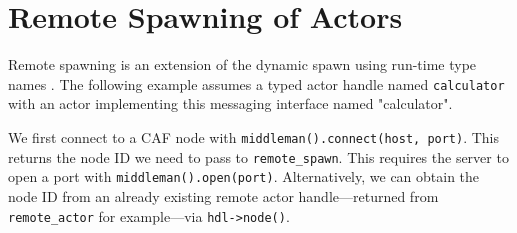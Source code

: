 \section{Remote Spawning of Actors \experimental}
\label{remote-spawn}

Remote spawning is an extension of the dynamic spawn using run-time type names . The following example assumes a typed actor handle named \lstinline^calculator^ with an actor implementing this messaging interface named "calculator".



We first connect to a CAF node with \lstinline^middleman().connect(host, port)^. This returns the node ID we need to pass to \lstinline^remote_spawn^. This requires the server to open a port with \lstinline^middleman().open(port)^. Alternatively, we can obtain the node ID from an already existing remote actor handle---returned from \lstinline^remote_actor^ for example---via \lstinline^hdl->node()^.